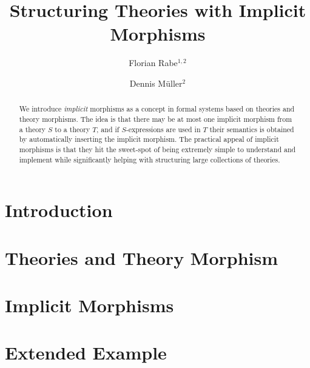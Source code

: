 \documentclass[orivec]{llncs}
\begin{document}
\title{Structuring Theories with Implicit Morphisms}
\author{Florian Rabe$^{1,2}$ \and Dennis M\"uller$^2$}
\maketitle

\begin{abstract}
We introduce \emph{implicit} morphisms as a concept in formal systems based on theories and theory morphisms.
The idea is that there may be at most one implicit morphism from a theory $S$ to a theory $T$, and if $S$-expressions are used in $T$ their semantics is obtained by automatically inserting the implicit morphism.
The practical appeal of implicit morphisms is that they hit the sweet-spot of being extremely simple to understand and implement while significantly helping with structuring large collections of theories.
\end{abstract}


\section{Introduction}


\section{Theories and Theory Morphism}\label{sec:mmt}


%

\section{Implicit Morphisms}


%

\section{Extended Example}


%
\end{document}
